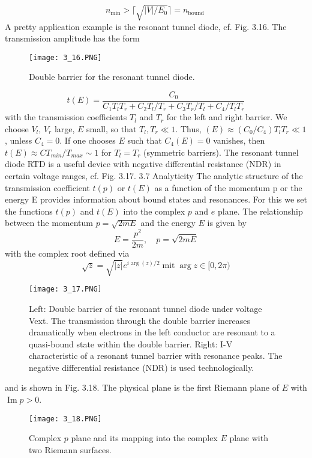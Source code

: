 \begin{equation}
    n_{\min }>\lceil\sqrt{|V| / E_{0}}\rceil= n_{\text {bound }}
    \end{equation}
A pretty application example is the resonant tunnel diode, cf. Fig. 3.16. The transmission amplitude has the form
\begin{figure}[ht]
    \begin{minipage}{0.5\textwidth}
        \centering
        \texttt{[image: 3\_16.PNG]}
    \end{minipage}
    \begin{minipage}{0.5\textwidth}
        \caption{Double barrier for the resonant tunnel diode.}
    \end{minipage}
\end{figure}
\begin{equation}
    t(E)=\frac{C_{0}}{C_{1} T_{l} T_{r}+C_{2} T_{l} / T_{r}+C_{3} T_{r} / T_{l}+C_{4} / T_{l} T_{r}}
    \end{equation}
with the transmission coefficients $T_l$ and $T_r$ for the left and right barrier. We choose $V_l$, $V_r$ large, $E$ small, so that $T_l, T_r \ll 1$. Thus, $(E) ≈ (C_0 / C_4) T_lT_r \ll 1$, unless $C_4 = 0$. If one chooses $E$ such that $C_4 (E) = 0$ vanishes, then $t (E) \approx CT_{min} / T_{max} \sim 1$ for $T_l = T_r$ (symmetric barriers). The resonant tunnel diode RTD is a useful device with negative differential resistance (NDR) in certain voltage ranges, cf. Fig. 3.17.
3.7 Analyticity
The analytic structure of the transmission coefficient $t (p)$ or $t (E)$ as a function of the momentum p or the energy E provides information about bound states and resonances. For this we set the functions $t (p)$ and $t (E)$ into the complex $p$ and $e$ plane. The relationship between the momentum $p = \sqrt{2mE}$ and the energy $E$ is given by
\begin{equation}
    E=\frac{p^{2}}{2 m}, \quad p=\sqrt{2 m E}
    \end{equation}
with the complex root defined via
\begin{equation}
    \sqrt{z}=\sqrt{|z|} e^{i \arg (z) / 2} \operatorname{mit} \arg z \in[0,2 \pi)
    \end{equation}
\begin{figure}[ht]
        \centering
        \texttt{[image: 3\_17.PNG]}
        \caption{Left: Double barrier of the resonant tunnel diode under voltage Vext. The transmission through the double barrier increases dramatically when electrons in the left conductor are resonant to a quasi-bound state within the double barrier. Right: I-V characteristic of a resonant tunnel barrier with resonance peaks. The negative differential resistance (NDR) is used technologically.}
\end{figure}
and is shown in Fig. 3.18. The physical plane is the first Riemann plane of $E$ with $\operatorname{Im} p> 0$.
\begin{figure}[ht]
    \centering
    \texttt{[image: 3\_18.PNG]}
    \caption{Complex $p$ plane and its mapping into the complex $E$ plane with two Riemann surfaces.}
\end{figure}
